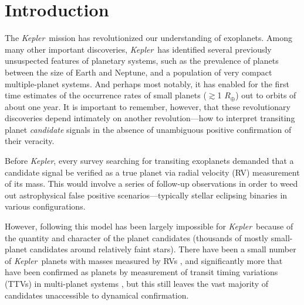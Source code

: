 \documentclass{emulateapj}
\newcommand{\kepler}{\textit{Kepler}}
\begin{document}

\keywords{}


\section{Introduction}

The \kepler\ mission has revolutionized our understanding of
exoplanets.  Among many other important discoveries, \kepler\ has
identified several previously unsuspected features of planetary
systems, such as the prevalence of planets between the size of Earth
and Neptune, and a population of very compact multiple-planet
systems. And perhaps most notably, it has enabled for the first time
estimates of the occurrence rates of small planets ($\gtrsim$1
$R_\oplus$) out to orbits of about one year.  It is important to
remember, however, that these revolutionary discoveries depend
intimately on another revolution---how to interpret transiting planet
\textit{candidate} signals in the absence of unambiguous positive
confirmation of their veracity. 

Before \kepler, every survey searching for transiting exoplanets
demanded that a candidate signal be verified as a true planet via
radial velocity (RV) measurement of its mass.  This would involve a
series of follow-up observations in order to weed out astrophysical
false positive scenarios---typically stellar eclipsing binaries in
various configurations.  

However, following this model has been largely impossible for \kepler\
because of the quantity and character of the planet candidates
(thousands of mostly small-planet candidates around relatively faint
stars).  There have been a small number of \kepler\ planets with
masses measured by RVs \citep[e.g.,][]{Marcy:2014}, and significantly
more that have been confirmed as planets by measurement of transit
timing variations (TTVs) in multi-planet systems
\citep[e.g.,][]{Ford:2012,Steffen:2012,Fabrycky:2012,Steffen:2013},
but this still leaves the vast majority of candidates unaccessible to
dynamical confirmation.
\end{document}
